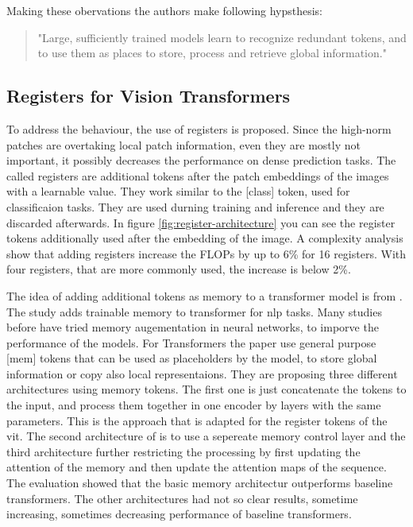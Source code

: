 \documentclass[conference]{IEEEtran}
\begin{document}
  Making these obervations the authors make following hypsthesis:
  \begin{quote}
    "Large, sufficiently trained models learn to recognize redundant tokens, and to use them as places to store, process and retrieve global information." \cite{registers}
  \end{quote}

  \subsection{Registers for Vision Transformers}


  To address the behaviour, the use of registers is proposed. Since the high-norm patches are overtaking local patch information, even they are mostly not important, it possibly decreases the performance on dense prediction tasks. The called registers are additional tokens after the patch embeddings of the images with a learnable value. They work similar to the [class] token, used for classificaion tasks. They are used durning training and inference and they are discarded afterwards. In figure \ref{fig:register-architecture} you can see the register tokens additionally used after the embedding of the image. A complexity analysis show that adding registers increase the FLOPs by up to 6\% for 16 registers. With four registers, that are more commonly used, the increase is below 2\%.


  The idea of adding additional tokens as memory to a transformer model is from \cite{memorytransformer}. The study adds trainable memory to transformer for \ac{nlp} tasks. Many studies before have tried memory augementation in neural networks, to imporve the performance of the models. For Transformers the paper use general purpose [mem] tokens that can be used as placeholders by the model, to store global information or copy also local representaions. They are proposing three different architectures using memory tokens. The first one is just concatenate the tokens to the input, and process them together in one encoder by layers with the same parameters. This is the approach that is adapted for the register tokens of the \ac{vit}. The second architecture of \cite{memorytransformer} is to use a sepereate memory control layer and the third architecture further restricting the processing by first updating the attention of the memory and then update the attention maps of the sequence. The evaluation showed that the basic memory architectur outperforms baseline transformers. The other architectures had not so clear results, sometime increasing, sometimes decreasing performance of baseline transformers.
\end{document}
